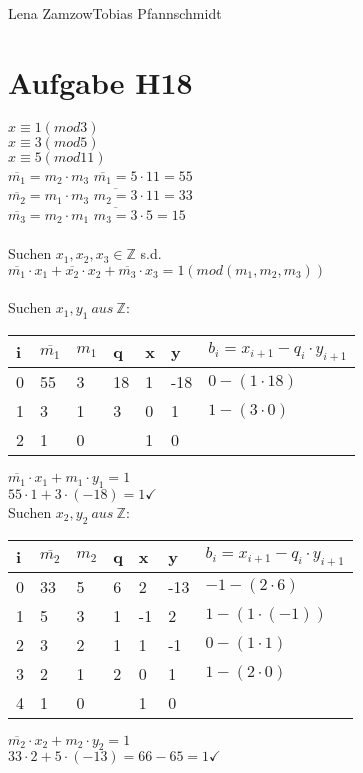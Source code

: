 \documentclass[11pt,a4paper]{article}
\begin{document}
                {Lena Zamzow}{Tobias Pfannschmidt}{}{}{}


\section*{Aufgabe H18}
$x\equiv1(mod 3)$\\
$x\equiv3(mod 5)$\\
$x\equiv5 (mod 11)$\\
$\overline{m_1}=m_2\cdot m_3$   $\overline{m_1} = 5 \cdot 11 = 55$\\
$\overline{m_2}=m_1\cdot m_3$   $\overline{m_2 = 3} \cdot 11 = 33$\\
$\overline{m_3}=m_2\cdot m_1$   $\overline{m_3 = 3} \cdot 5 = 15$\\
\\
Suchen $x_1, x_2, x_3 \in \mathbb{Z}$ s.d.\\
$\overline{m_1}\cdot x_1 + \overline{x_2} \cdot x_2 + \overline{m_3} \cdot x_3 = 1(mod(m_1,m_2,m_3))$\\
\\
Suchen $x_1,y_1 ~aus~ \mathbb{Z}:$\\

\begin{center}
	\begin{tabular}{ | l | l | l | l | l | l | l|}
		\hline
		i&$\overline{m_1}$&$m_1$&q&x&y&$b_i=x_{i+1}-q_i \cdot y_{i+1} $ \\ \hline \hline		
		0&55&3&18&1&-18&$0-(1 \cdot 18 )$ \\ \hline
		1&3&1&3&0&1&$1-(3 \cdot 0 )$ \\ \hline
		2&1&0&&1&0&\\ \hline	
	\end{tabular}
\end{center}
$\overline{m_1} \cdot x_1 + m_1 \cdot y_1 = 1$\\
$55 \cdot 1 + 3\cdot (-18) = 1 \checkmark$
\\
Suchen $x_2,y_2 ~aus~ \mathbb{Z}:$\\
\begin{center}
	\begin{tabular}{ | l | l | l | l | l | l | l|}
		\hline
		i&$\overline{m_2}$&$m_2$&q&x&y&$b_i=x_{i+1}-q_i \cdot y_{i+1} $ \\ \hline \hline
		0&33&5&6&2&-13&$-1-(2 \cdot 6 )$ \\ \hline
		1&5&3&1&-1&2&$1-(1 \cdot (-1))$ \\ \hline
		2&3&2&1&1&-1&$0-(1 \cdot 1)$ \\ \hline
		3&2&1&2&0&1&$1-(2\cdot 0)$ \\ \hline
		4&1&0&&1&0&\\ \hline
	\end{tabular}
\end{center}
$\overline{m_2} \cdot x_2 + m_2 \cdot y_2 = 1$\\
$33\cdot 2 + 5 \cdot (-13) = 66-65 = 1 \checkmark$\\
\end{document}
